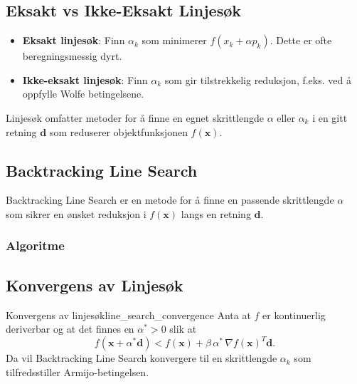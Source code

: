 \subsection{Eksakt vs Ikke-Eksakt Linjesøk}

\begin{itemize}
	\item \textbf{Eksakt linjesøk}: Finn $\alpha_k$ som minimerer $f(x_k + \alpha p_k)$. Dette er ofte beregningsmessig dyrt.
	\item \textbf{Ikke-eksakt linjesøk}: Finn $\alpha_k$ som gir tilstrekkelig reduksjon, f.eks. ved å oppfylle Wolfe betingelsene.
\end{itemize}

Linjesøk omfatter metoder for å finne en egnet skrittlengde \(\alpha\) eller \(\alpha_k\) i en gitt retning \(\symbf{d}\) som reduserer objektfunksjonen \(f(\symbf{x})\).

\subsection{Backtracking Line Search}
Backtracking Line Search er en metode for å finne en passende skrittlengde \(\alpha\) som sikrer en ønsket reduksjon i \(f(\symbf{x})\) langs en retning \(\symbf{d}\).

\subsubsection{Algoritme}
\begin{algorithm}[H]
	\SetAlgoLined
	\caption{Backtracking Line Search (BLS)}
	\label{alg:backtracking_line_search}
\end{algorithm}

\subsection{Konvergens av Linjesøk}
\begin{theorem}{Konvergens av linjesøk}{line_search_convergence}
	Anta at \(f\) er kontinuerlig deriverbar og at det finnes en \(\alpha^\ast > 0\) slik at
	\[
		f(\symbf{x} + \alpha^\ast \symbf{d}) < f(\symbf{x}) + \beta\,\alpha^\ast\,\nabla f(\symbf{x})^T \symbf{d}.
	\]
	Da vil Backtracking Line Search konvergere til en skrittlengde \(\alpha_k\) som tilfredsstiller Armijo-betingelsen.
\end{theorem}

